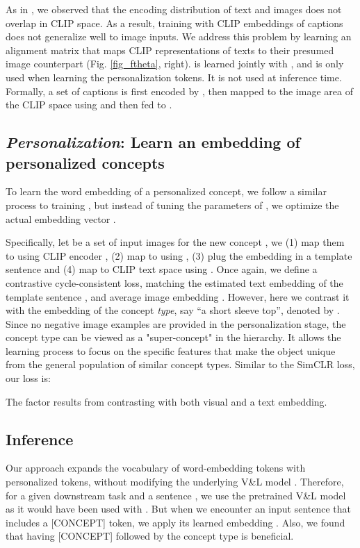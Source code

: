 \documentclass[runningheads]{llncs}
\newcommand{\figref}[1]{Fig. \ref{#1}}
\newcommand\edit[1]{#1}
\newcommand{\VL}{V\&L {}}
\newcommand{\concept}{[CONCEPT]}
\begin{document}
As in \cite{MindtheGap}, we observed that the encoding distribution of text and images does not overlap in CLIP space. As a result, training  with CLIP embeddings of captions does not generalize well to image inputs. We address this problem by learning an alignment matrix  that maps CLIP representations of texts to their presumed image counterpart (\figref{fig_ftheta}, right).  is learned jointly with \edit{, and is only used when learning the personalization tokens. It is not used at inference time.} Formally, a set of captions is first encoded by , then mapped to the image area of the CLIP space using  and then fed to .


\subsection{\textit{Personalization}: Learn an embedding of personalized concepts}
To learn the word embedding of a personalized concept, we follow a similar process to training , but instead of tuning the parameters of , we optimize the actual embedding vector .

Specifically, let  be a set of input images for the new concept , we (1) map them to  using CLIP encoder , (2) map to  using , (3) plug the embedding  in a template sentence and (4) map to CLIP text space using . Once again, we define a contrastive cycle-consistent loss, matching the estimated text embedding of the template sentence , and average image embedding .
However, here we contrast it with the embedding of the concept \textit{type}, say ``a short sleeve top'', denoted by . Since no negative image examples are provided in the personalization stage, the concept type can be viewed as a "super-concept" in the hierarchy. It allows the learning process to focus on the specific features that make the object unique from the general population of similar concept types. Similar to the SimCLR \cite{chen2020simple} loss, our loss is:



\edit{The factor  results from contrasting   with both  visual and a text embedding.}






\subsection{Inference}
Our approach expands the vocabulary of word-embedding tokens with personalized tokens, without modifying the underlying \VL model . Therefore, for a given downstream task  and a sentence , we use the pretrained \VL model  as it would have been used with . But when we encounter an input sentence  that includes a \concept{} token,
we apply its learned embedding . Also, we found that having \concept{} followed by the concept type  is beneficial.
\end{document}
